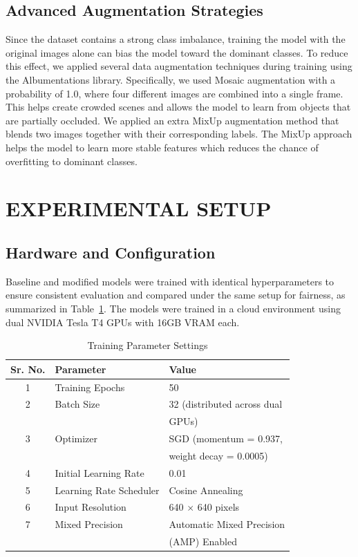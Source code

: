 \documentclass[sigconf]{acmart}
\begin{document}
\subsection{Advanced Augmentation Strategies}

Since the dataset contains a strong class imbalance, training the model with the original images alone can bias the model toward the dominant classes. To reduce this effect, we applied several data augmentation techniques during training using the Albumentations library. Specifically, we used Mosaic augmentation with a probability of 1.0, where four different images are combined into a single frame. This helps create crowded scenes and allows the model to learn from objects that are partially occluded. We applied an extra MixUp augmentation method that blends two images together with their corresponding labels. The MixUp approach helps the model to learn more stable features which reduces the chance of overfitting to dominant classes. 

\section{EXPERIMENTAL SETUP}

\subsection{Hardware and Configuration}

Baseline and modified models were trained with identical hyperparameters to ensure consistent evaluation and compared under the same setup for fairness, as summarized in Table~\ref{tab:param}. The models were trained in a cloud environment using dual NVIDIA Tesla T4 GPUs with 16GB VRAM each. 
\begin{table}[h]
  \centering
  \caption{Training Parameter Settings}
  \label{tab:param}
  \begin{tabular}{cll}
    \toprule
    \textbf{Sr. No.} & \textbf{Parameter} & \textbf{Value} \\ 
    \midrule
    1 & Training Epochs & 50 \\ 
    2 & Batch Size & 32 (distributed across dual \\ 
      &            & GPUs) \\ 
    3 & Optimizer & SGD (momentum = 0.937, \\ 
      &           & weight decay = 0.0005) \\ 
    4 & Initial Learning Rate & 0.01 \\ 
    5 & Learning Rate Scheduler & Cosine Annealing \\ 
    6 & Input Resolution & 640 $\times$ 640 pixels \\ 
    7 & Mixed Precision & Automatic Mixed Precision \\ 
      &                 & (AMP) Enabled \\ 
    \bottomrule
  \end{tabular}
\end{table}
\end{document}
